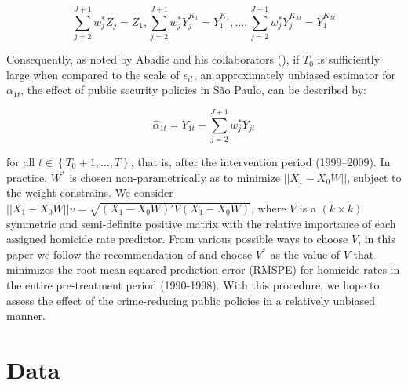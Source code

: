 \documentclass[a4paper,11pt]{article}
\begin{document}
$$\sum_{j = 2}^{J + 1} w_{j}^{*} Z_{j} = Z_{1}, \sum_{j = 2}^{J + 1} w_{j}^{*}\bar{Y}_{j}^{K_{1}} = \bar{Y}_{1}^{K_{1}}, \dots, \sum_{j = 2}^{J + 1} w_{j}^{*}\bar{Y}_{j}^{K_{M}} = \bar{Y}_{1}^{K_{M}}$$ 

Consequently, as noted by Abadie and his collaborators (\citeyear{abadie2010}), if $T_{0}$ is sufficiently large when compared to the scale of $\epsilon_{it}$, an approximately unbiased estimator for $\alpha_{1t}$, the effect of public security policies in S\~{a}o Paulo, can be described by:

$$\hat{\alpha}_{1t} = Y_{1t} - \sum_{j = 2}^{J + 1} w_{j}^{*} Y_{jt}$$

for all $t \in \left\{T_{0} + 1, \dots, T \right\}$, that is, after the intervention period (1999--2009). In practice, $W^{*}$ is chosen non-parametrically as to minimize $||X_{1} - X_{0}W||$, subject to the weight constrains. We consider $||X_{1} - X_{0}W||v = \sqrt{(X_{1} - X_{0}W)'V (X_{1} - X_{0}W)}$, where $V$ is a $(k \times k)$ symmetric and semi-definite positive matrix with the relative importance of each assigned homicide rate predictor. From various possible ways to choose $V$, in this paper we follow the recommendation of \citet{abadie2003} and choose $V^{*}$ as the value of $V$ that minimizes the root mean squared prediction error (RMSPE) for homicide rates in the entire pre-treatment period (1990-1998). With this procedure, we hope to assess the effect of the crime-reducing public policies in a relatively unbiased manner. 

\section{Data}
\end{document}
